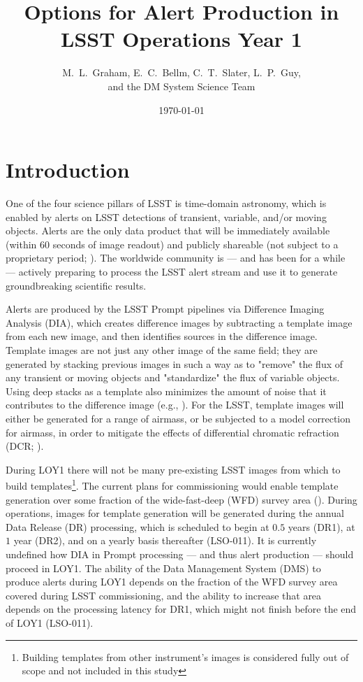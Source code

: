 \documentclass[DM,toc]{lsstdoc}
\title[Alert Production in Year 1]{Options for Alert Production in \\ LSST Operations Year 1}
\author{M.~L.~Graham, E.~C.~Bellm, C.~T.~Slater, L.~P.~Guy, \\ and the DM System Science Team}
\date{\today}
\begin{document}
\maketitle

\section{Introduction} \label{sec:intro}

One of the four science pillars of LSST is time-domain astronomy, which is enabled by alerts on LSST detections of transient, variable, and/or moving objects. Alerts are the only data product that will be immediately available (within $60$ seconds of image readout) and publicly shareable (not subject to a proprietary period; ).
The worldwide community is --- and has been for a while --- actively preparing to process the LSST alert stream and use it to generate groundbreaking scientific results. 

Alerts are produced by the LSST Prompt pipelines via Difference Imaging Analysis (DIA), which creates difference images by subtracting a template image from each new image, and then identifies sources in the difference image.
Template images are not just any other image of the same field; they are generated by stacking previous images in such a way as to "remove" the flux of any transient or moving objects and "standardize" the flux of variable objects.
Using deep stacks as a template also minimizes the amount of noise that it contributes to the difference image (e.g., ).
For the LSST, template images will either be generated for a range of airmass, or be subjected to a model correction for airmass, in order to mitigate the effects of differential chromatic refraction (DCR; ).

During LOY1 there will not be many pre-existing LSST images from which to build templates\footnote{Building templates from other instrument's images is considered fully out of scope and not included in this study}.
The current plans for commissioning would enable template generation over some fraction of the wide-fast-deep (WFD) survey area ().
During operations, images for template generation will be generated during the annual Data Release (DR) processing, which is scheduled to begin at $0.5$ years (DR1), at $1$ year (DR2), and on a yearly basis thereafter (LSO-011).
It is currently undefined how DIA in Prompt processing --- and thus alert production --- should proceed in LOY1.
The ability of the Data Management System (DMS) to produce alerts during LOY1 depends on the fraction of the WFD survey area covered during LSST commissioning, and the ability to increase that area depends on the processing latency for DR1, which might not finish before the end of LOY1 (LSO-011).
\end{document}
